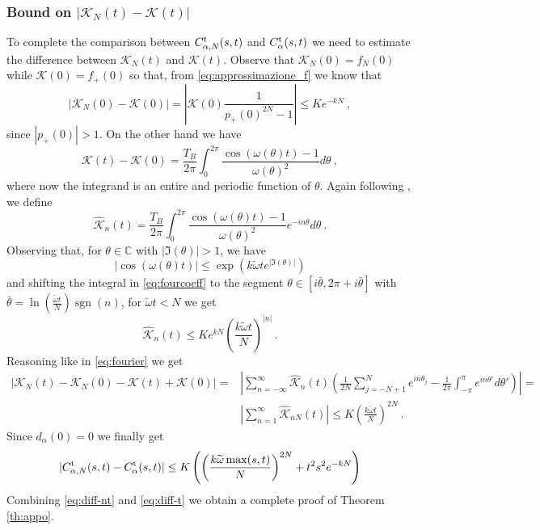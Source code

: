 \documentclass[11pt]{article}
\numberwithin{equation}{section}
\DeclareMathOperator{\sgn}{sgn}
\numberwithin{theorem}{section}
\newcommand{\matht}[1]{\texorpdfstring{#1}{}}
\def\tilde#1{\widetilde{#1}}
\begin{document}
\subsubsection{Bound on \matht{$|{\mathcal K}_N(t)-{\mathcal K}(t)|$}}

To complete the comparison between $C^{\rm t}_{\alpha,N}(s,t)$ and $C^{\rm t}_{\alpha}(s,t)$ we need to estimate the
difference between ${\mathcal K}_N(t)$ and ${\mathcal K}(t)$. Observe that ${\mathcal K}_N(0)=f_N(0)$ while 
${\mathcal K}(0)=f_+(0)$ so that, from \eqref{eq:approssimazione_f} we know that
\[
|\mathcal K_N(0)-\mathcal K(0)|=\left|\mathcal
K(0)\frac{1}{p_+(0)^{2N}-1}\right|\leq K e^{-kN}\ ,
\]
since $|p_+(0)|>1$. On the other hand we have
\[
\mathcal K(t)-\mathcal
K(0)=\frac{T_B}{2\pi}\int_0^{2\pi}\frac{\cos(\omega(\theta)t)-1}{\omega(\theta)^2}d\theta\ ,
\]
where now the integrand is an entire and periodic function of $\theta$. Again following \cite{DR1984}, we define
\begin{equation}\label{eq:fourcoeff}
\hat {\mathcal
  K}_{n}(t)=\frac{T_B}{2\pi}\int_0^{2\pi}\frac{\cos(\omega(\theta)t)-1}{\omega(\theta)^2}e^{-in\theta}d\theta\ .
\end{equation}
Observing that, for $\theta\in\mathds C$ with $|\Im(\theta)|>1$, we have
\[
 |\cos(\omega(\theta)t)|\leq \exp\left(k\tilde\omega te^{|\Im(\theta)|}\right)
\]
and shifting the integral in \eqref{eq:fourcoeff} to the segment $\theta\in[i\bar\theta,2\pi+i\bar\theta]$ with 
$\bar\theta=\ln\left(\frac {\tilde\omega t}N\right)\sgn(n)$, for $\tilde\omega t<N$ we get
\[
 \hat {\mathcal K}_{n}(t)
\leq Ke^{kN}\left(\frac{k\tilde\omega t}N\right)^{|n|}\, .
\]
Reasoning like in \eqref{eq:fourier} we get
\[
\begin{aligned}
\left|\mathcal K_N(t)-\mathcal K_N(0)-\mathcal K(t)+\mathcal K(0)\right|=&
\left|\sum_{n=-\infty}^\infty \hat{\mathcal  K}_n(t)\left( 
\frac 1{2N} \sum_{j=-N+1}^N e^{in\theta_j}-\frac1{2\pi}\int_{-\pi}^\pi e^{in\theta'}d\theta'\right)\right|=\\
&\left|\sum_{n=1}^\infty\hat{\mathcal  K}_{nN}(t)\right|\leq 
K\left(\frac{k\tilde\omega t}N\right)^{2N}\ .
\end{aligned}
\]
Since $d_\alpha(0)=0$ we finally get
\begin{equation}\label{eq:diff-t}
|C^{\rm t}_{\alpha,N}(s,t)-C^{\rm t}_{\alpha}(s,t)|\leq
K\left(\left(\frac{k\tilde\omega\max(s,t)}{N}\right)^{2N}+ t^2s^2e^{-kN}\right)
\end{equation}
Combining \eqref{eq:diff-nt} and \eqref{eq:diff-t} we obtain a complete proof of Theorem \ref{th:appo}.
\medskip
\end{document}
